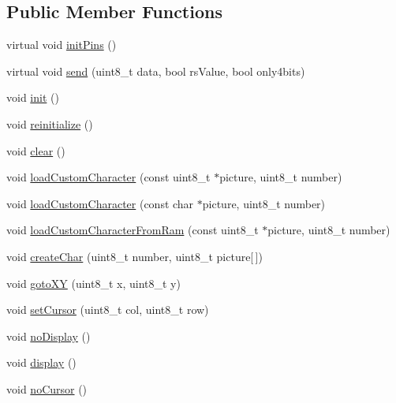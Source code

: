 \subsection*{Public Member Functions}
\begin{DoxyCompactItemize}
\item 
virtual void \hyperlink{class_zumo32_u4_l_c_d_a15ad296b2faa2196760b816301983ea5}{init\+Pins} ()
\item 
virtual void \hyperlink{class_zumo32_u4_l_c_d_a219e5ae0c67b8a5fd359c397c69ab713}{send} (uint8\+\_\+t data, bool rs\+Value, bool only4bits)
\item 
void \hyperlink{class_pololu_h_d44780_base_a1c2a3edc8cfecde7e6fd2a83c17c0e23}{init} ()
\item 
void \hyperlink{class_pololu_h_d44780_base_a10c1c42406708172fc38b718790ba881}{reinitialize} ()
\item 
void \hyperlink{class_pololu_h_d44780_base_a4d35e9a47ceef1a7582e180165e0eae1}{clear} ()
\item 
void \hyperlink{class_pololu_h_d44780_base_a73d331af44ec2e624aa0468ce13f64e4}{load\+Custom\+Character} (const uint8\+\_\+t $\ast$picture, uint8\+\_\+t number)
\item 
void \hyperlink{class_pololu_h_d44780_base_a4f22d613433fce0e0c661a237ade9aeb}{load\+Custom\+Character} (const char $\ast$picture, uint8\+\_\+t number)
\item 
void \hyperlink{class_pololu_h_d44780_base_a72674b5466690b49b639ae2ec3e4983f}{load\+Custom\+Character\+From\+Ram} (const uint8\+\_\+t $\ast$picture, uint8\+\_\+t number)
\item 
void \hyperlink{class_pololu_h_d44780_base_afd802cdc57783830acfe2415355d9f09}{create\+Char} (uint8\+\_\+t number, uint8\+\_\+t picture\mbox{[}$\,$\mbox{]})
\item 
void \hyperlink{class_pololu_h_d44780_base_a4886df8c888669cf71675072689ace9b}{goto\+XY} (uint8\+\_\+t x, uint8\+\_\+t y)
\item 
void \hyperlink{class_pololu_h_d44780_base_aeb3377822dc672398a991f06a00312c0}{set\+Cursor} (uint8\+\_\+t col, uint8\+\_\+t row)
\item 
void \hyperlink{class_pololu_h_d44780_base_abc2d4e126017565c2a0cf2aac67870a0}{no\+Display} ()
\item 
void \hyperlink{class_pololu_h_d44780_base_af5dd1e137bfe9310a418924b7483fcdf}{display} ()
\item 
void \hyperlink{class_pololu_h_d44780_base_ab40886cf0b563a1806bc9391d00b032d}{no\+Cursor} ()
\item 

\end{DoxyCompactItemize}
